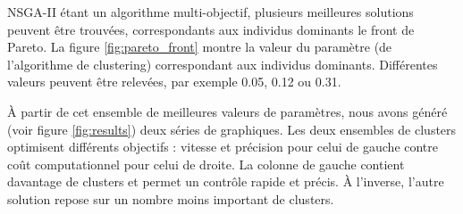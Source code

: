 \documentclass[draft]{llncs}
\begin{document}
NSGA-II étant un algorithme multi-objectif, plusieurs meilleures solutions peuvent être trouvées, correspondants aux individus dominants le front de Pareto.
La figure \ref{fig:pareto_front} montre la valeur du paramètre (de l'algorithme de clustering) correspondant aux individus dominants.
Différentes valeurs peuvent être relevées, par exemple 0.05, 0.12 ou 0.31.

À partir de cet ensemble de meilleures valeurs de paramètres, nous avons généré (voir figure \ref{fig:results}) deux séries de graphiques.
Les deux ensembles de clusters optimisent différents objectifs : vitesse et précision pour celui de gauche contre coût computationnel pour celui de droite.
La colonne de gauche contient davantage de clusters et permet un contrôle rapide et précis.
À l'inverse, l'autre solution repose sur un nombre moins important de clusters.

\end{document}
